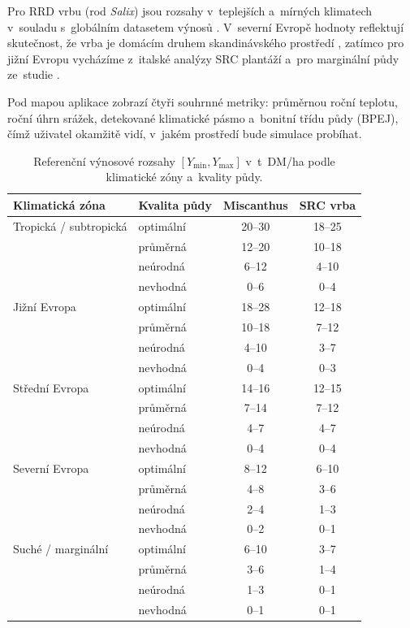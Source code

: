 Pro RRD vrbu (rod \textit{Salix}) jsou rozsahy v~teplejších 
a~mírných klimatech v~souladu s~globálním datasetem výnosů 
\citep{castellanoalbors_2025}. V~severní Evropě hodnoty 
reflektují skutečnost, že vrba je domácím druhem skandinávského 
prostředí \citep{Verwijst13}, zatímco pro jižní Evropu vycházíme 
z~italské analýzy SRC plantáží \citep{BACENETTI2016} a~pro 
marginální půdy ze~studie \citep{Richard2019}.

Pod mapou aplikace zobrazí čtyři souhrnné metriky: průměrnou roční 
teplotu, roční úhrn srážek, detekované klimatické pásmo a~bonitní 
třídu půdy (BPEJ), čímž uživatel okamžitě vidí, v~jakém prostředí 
bude simulace probíhat.

\begin{table}[H]
\centering
\caption{Referenční výnosové rozsahy $[Y_{\min}, Y_{\max}]$ 
v~t~DM/ha podle klimatické zóny a~kvality půdy. }
\label{tab:vynosove-rozsahy}
\begin{tabular}{llcc}
\toprule
\textbf{Klimatická zóna} & \textbf{Kvalita půdy} 
& \textbf{Miscanthus} & \textbf{SRC vrba} \\
\midrule
Tropická / subtropická  & optimální & 20--30 & 18--25 \\
                        & průměrná  & 12--20 & 10--18 \\
                        & neúrodná  & 6--12  & 4--10  \\
                        & nevhodná  & 0--6   & 0--4      \\
\midrule
Jižní Evropa            & optimální & 18--28 & 12--18 \\
                        & průměrná  & 10--18 & 7--12  \\
                        & neúrodná  & 4--10  & 3--7   \\
                        & nevhodná  & 0--4   & 0--3      \\
\midrule
Střední Evropa          & optimální & 14--16 & 12--15 \\
                        & průměrná  & 7--14  & 7--12  \\
                        & neúrodná  & 4--7   & 4--7   \\
                        & nevhodná  & 0--4   & 0--4   \\
\midrule
Severní Evropa          & optimální & 8--12  & 6--10  \\
                        & průměrná  & 4--8   & 3--6   \\
                        & neúrodná  & 2--4   & 1--3   \\
                        & nevhodná  & 0--2   & 0--1      \\
\midrule
Suché / marginální      & optimální & 6--10  & 3--7   \\
                        & průměrná  & 3--6   & 1--4   \\
                        & neúrodná  & 1--3   & 0--1   \\
                        & nevhodná  & 0--1   & 0--1      \\
\bottomrule
\end{tabular}
\end{table}



